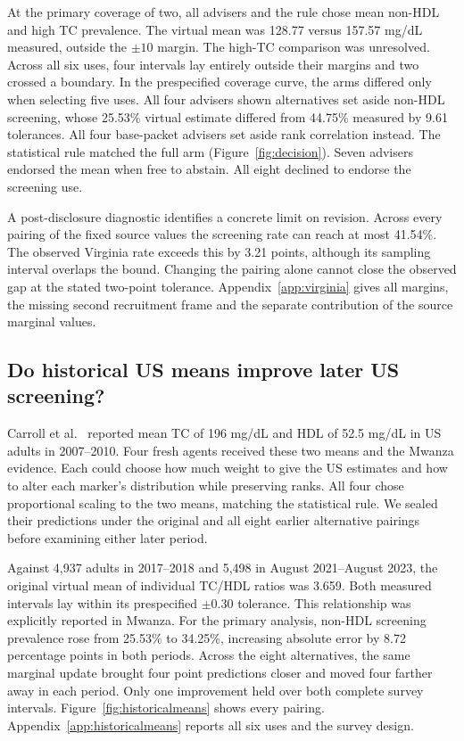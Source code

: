 \documentclass[sigconf,anonymous,review]{acmart}
\begin{document}
At the primary coverage of two, all advisers and the rule chose mean non-HDL and high TC prevalence. The virtual mean was 128.77 versus 157.57 mg/dL measured, outside the $\pm10$ margin. The high-TC comparison was unresolved. Across all six uses, four intervals lay entirely outside their margins and two crossed a boundary. In the prespecified coverage curve, the arms differed only when selecting five uses. All four advisers shown alternatives set aside non-HDL screening, whose 25.53\% virtual estimate differed from 44.75\% measured by 9.61 tolerances. All four base-packet advisers set aside rank correlation instead. The statistical rule matched the full arm (Figure~\ref{fig:decision}). Seven advisers endorsed the mean when free to abstain. All eight declined to endorse the screening use.

A post-disclosure diagnostic identifies a concrete limit on revision. Across every pairing of the fixed source values the screening rate can reach at most 41.54\%. The observed Virginia rate exceeds this by 3.21 points, although its sampling interval overlaps the bound. Changing the pairing alone cannot close the observed gap at the stated two-point tolerance. Appendix~\ref{app:virginia} gives all margins, the missing second recruitment frame and the separate contribution of the source marginal values.

\subsection{Do historical US means improve later US screening?}
Carroll et al.~\cite{carroll_history} reported mean TC of 196 mg/dL and HDL of 52.5 mg/dL in US adults in 2007--2010. Four fresh agents received these two means and the Mwanza evidence. Each could choose how much weight to give the US estimates and how to alter each marker's distribution while preserving ranks. All four chose proportional scaling to the two means, matching the statistical rule. We sealed their predictions under the original and all eight earlier alternative pairings before examining either later period.

Against 4,937 adults in 2017--2018 and 5,498 in August 2021--August 2023, the original virtual mean of individual TC/HDL ratios was 3.659. Both measured intervals lay within its prespecified $\pm0.30$ tolerance. This relationship was explicitly reported in Mwanza. For the primary analysis, non-HDL screening prevalence rose from 25.53\% to 34.25\%, increasing absolute error by 8.72 percentage points in both periods. Across the eight alternatives, the same marginal update brought four point predictions closer and moved four farther away in each period. Only one improvement held over both complete survey intervals. Figure~\ref{fig:historicalmeans} shows every pairing. Appendix~\ref{app:historicalmeans} reports all six uses and the survey design.
\end{document}

